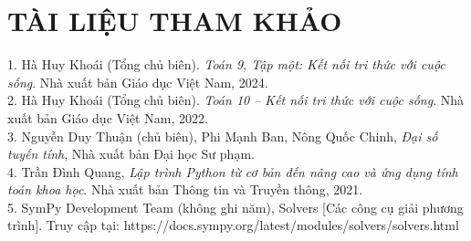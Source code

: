 \documentclass[13pt,a4paper]{article}
\begin{document}
\section*{TÀI LIỆU THAM KHẢO}
1. Hà Huy Khoái (Tổng chủ biên). \textit{Toán 9, Tập một: Kết nối tri thức với cuộc sống}. Nhà xuất bản Giáo dục Việt Nam, 2024.\\
2. Hà Huy Khoái (Tổng chủ biên). \textit{Toán 10 – Kết nối tri thức với cuộc sống}. Nhà xuất bản Giáo dục Việt Nam, 2022.\\
3. Nguyễn Duy Thuận (chủ biên), Phi Mạnh Ban, Nông Quốc Chinh, \textit{Đại số tuyến tính}, Nhà xuất bản Đại học Sư phạm.\\
4. Trần Đình Quang, \textit{Lập trình Python từ cơ bản đến nâng cao và ứng dụng tính toán khoa học}. Nhà xuất bản Thông tin và Truyền thông, 2021.\\
5. SymPy Development Team (không ghi năm), Solvers [Các công cụ giải phương trình]. Truy cập tại: 
https://docs.sympy.org/latest/modules/solvers/solvers.html
\end{document}
